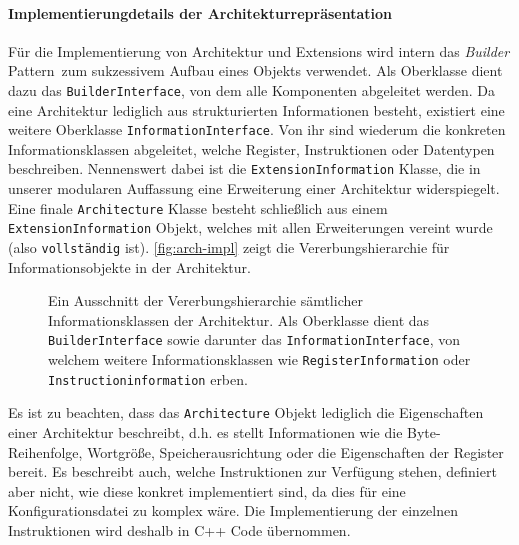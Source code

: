 
\paragraph{Implementierungdetails der Architekturrepräsentation}
\label{dev:arch-impl}

Für die Implementierung von Architektur und Extensions wird intern das
\emph{Builder} Pattern\ zum sukzessivem Aufbau eines Objekts verwendet. Als
Oberklasse dient dazu das \texttt{BuilderInterface}, von dem alle Komponenten
abgeleitet werden. Da eine Architektur lediglich aus strukturierten
Informationen besteht, existiert eine weitere Oberklasse
\texttt{InformationInterface}. Von ihr sind wiederum die konkreten
Informationsklassen abgeleitet, welche Register, Instruktionen oder Datentypen
beschreiben. Nennenswert dabei ist die \texttt{ExtensionInformation} Klasse, die
in unserer modularen Auffassung eine Erweiterung einer Architektur
widerspiegelt. Eine finale \texttt{Architecture} Klasse besteht schließlich aus
einem \texttt{ExtensionInformation} Objekt, welches mit allen Erweiterungen
vereint wurde (also \texttt{vollständig} ist). \autoref{fig:arch-impl} zeigt die
Vererbungshierarchie für Informationsobjekte in der Architektur.

\begin{figure}[h!]
  \centering
  \caption{Ein Ausschnitt der Vererbungshierarchie sämtlicher Informationsklassen der Architektur. Als Oberklasse dient das \texttt{BuilderInterface} sowie darunter das \texttt{InformationInterface}, von welchem weitere Informationsklassen wie \texttt{RegisterInformation} oder \texttt{Instructioninformation} erben.}
  \label{fig:arch-impl}
  \vspace{-0.5cm}
\end{figure}

Es ist zu beachten, dass das \texttt{Architecture} Objekt lediglich die
Eigenschaften einer Architektur beschreibt, d.h. es stellt Informationen wie die
Byte-Reihenfolge, Wortgröße, Speicherausrichtung oder die Eigenschaften der
Register bereit. Es beschreibt auch, welche Instruktionen zur Verfügung stehen,
definiert aber nicht, wie diese konkret implementiert sind, da dies für eine
Konfigurationsdatei zu komplex wäre. Die Implementierung der einzelnen
Instruktionen wird deshalb in C++ Code übernommen.
